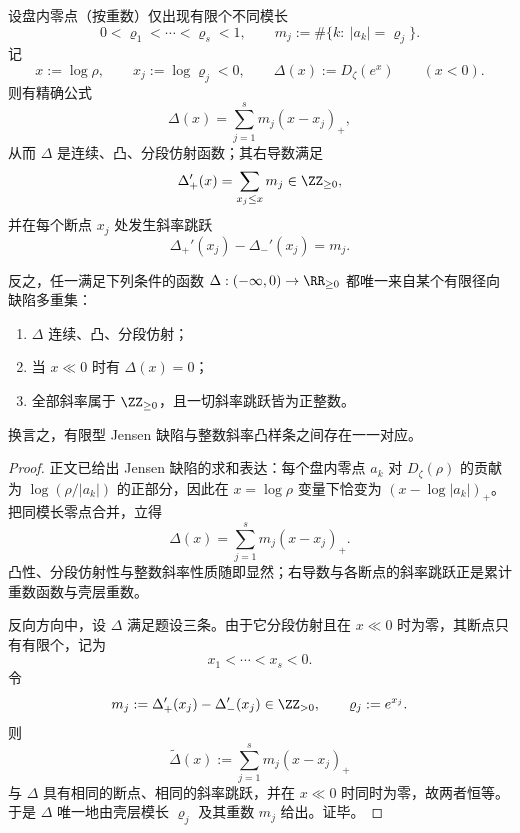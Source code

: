 \begin{theorem}\label{thm:conclusion-jensen-defect-radial-spline-rigidity}
设盘内零点（按重数）仅出现有限个不同模长
\[
0<\varrho_1<\cdots<\varrho_s<1,
\qquad
m_j:=\#\{k:\ |a_k|=\varrho_j\}.
\]
记
\[
x:=\log \rho,
\qquad
x_j:=\log \varrho_j<0,
\qquad
\Delta(x):=D_\zeta(e^x)
\qquad(x<0).
\]
则有精确公式
\[
\Delta(x)=\sum_{j=1}^s m_j(x-x_j)_+,
\]
从而 \(\Delta\) 是连续、凸、分段仿射函数；其右导数满足
\[
\Delta_+'(x)=\sum_{x_j\le x}m_j\in \ZZ_{\ge 0},
\]
并在每个断点 \(x_j\) 处发生斜率跳跃
\[
\Delta_+'(x_j)-\Delta_-'(x_j)=m_j.
\]

反之，任一满足下列条件的函数 \(\Delta:(-\infty,0)\to\RR_{\ge 0}\) 都唯一来自某个有限径向缺陷多重集：
\begin{enumerate}
  \item \(\Delta\) 连续、凸、分段仿射；
  \item 当 \(x\ll 0\) 时有 \(\Delta(x)=0\)；
  \item 全部斜率属于 \(\ZZ_{\ge 0}\)，且一切斜率跳跃皆为正整数。
\end{enumerate}
换言之，有限型 Jensen 缺陷与整数斜率凸样条之间存在一一对应。
\end{theorem}
\begin{proof}
正文已给出 Jensen 缺陷的求和表达：每个盘内零点 \(a_k\) 对 \(D_\zeta(\rho)\) 的贡献为 \(\log(\rho/|a_k|)\) 的正部分，因此在 \(x=\log\rho\) 变量下恰变为 \((x-\log|a_k|)_+\)。把同模长零点合并，立得
\[
\Delta(x)=\sum_{j=1}^s m_j(x-x_j)_+.
\]
凸性、分段仿射性与整数斜率性质随即显然；右导数与各断点的斜率跳跃正是累计重数函数与壳层重数。

反向方向中，设 \(\Delta\) 满足题设三条。由于它分段仿射且在 \(x\ll 0\) 时为零，其断点只有有限个，记为
\[
x_1<\cdots<x_s<0.
\]
令
\[
m_j:=\Delta_+'(x_j)-\Delta_-'(x_j)\in \ZZ_{>0},
\qquad
\varrho_j:=e^{x_j}.
\]
则
\[
\widetilde \Delta(x):=\sum_{j=1}^s m_j(x-x_j)_+
\]
与 \(\Delta\) 具有相同的断点、相同的斜率跳跃，并在 \(x\ll 0\) 时同时为零，故两者恒等。于是 \(\Delta\) 唯一地由壳层模长 \(\varrho_j\) 及其重数 \(m_j\) 给出。证毕。
\end{proof}

